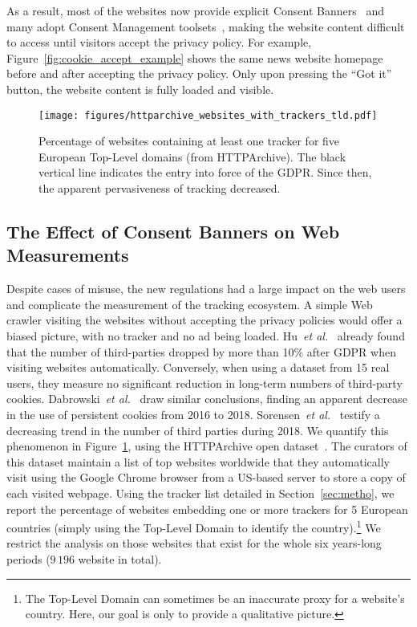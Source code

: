As a result, most of the websites now provide explicit Consent Banners~\cite{degeling2018we} and many adopt Consent Management toolsets~\cite{hills2020consent}, making the website content difficult to access until visitors accept the privacy policy. For example, Figure~\ref{fig:cookie_accept_example} shows the same news website homepage before and after accepting the privacy policy. Only upon pressing the ``Got it'' button, the website content is fully loaded and visible.



\begin{figure}[t]
    \centering
    \texttt{[image: figures/httparchive\_websites\_with\_trackers\_tld.pdf]}
    \caption{Percentage of websites containing at least one tracker for five European Top-Level domains (from HTTPArchive). The black vertical line indicates the entry into force of the GDPR. Since then, the apparent pervasiveness of tracking decreased.}
    \label{fig:ha_websites_trackers}
\end{figure}



\subsection{The Effect of Consent Banners on Web Measurements}

Despite cases of misuse, the new regulations had a large impact on the web users and complicate the measurement of the tracking ecosystem. A simple Web crawler visiting the websites without accepting the privacy policies would offer a biased picture, with no tracker and no ad being loaded. Hu~\emph{et al.}~\cite{hu2019characterising} already found that the number of third-parties dropped by more than 10\% after GDPR when visiting websites automatically. Conversely, when using a dataset from 15 real users, they measure no significant reduction in long-term numbers of third-party cookies. Dabrowski~\emph{et al.}~\cite{dabrowski2019measuring} draw similar conclusions, finding an apparent decrease in the use of persistent cookies from 2016 to 2018. Sorensen~\emph{et al.}~\cite{sorensen2019before} testify a decreasing trend in the number of third parties during 2018. We quantify this phenomenon in Figure~\ref{fig:ha_websites_trackers}, using the HTTPArchive open dataset~\cite{httparchive}. The curators of this dataset maintain a list of top websites worldwide that they automatically visit using the Google Chrome browser from a US-based server to store a copy of each visited webpage. Using the tracker list detailed in Section~\ref{sec:metho}, we report the percentage of websites embedding one or more trackers for 5 European countries (simply using the Top-Level Domain to identify the country).\footnote{The Top-Level Domain can sometimes be an inaccurate proxy for a website's country. Here, our goal is only to provide a qualitative picture.} We restrict the analysis on those websites that exist for the whole six years-long periods ($9\,196$ website in total).

